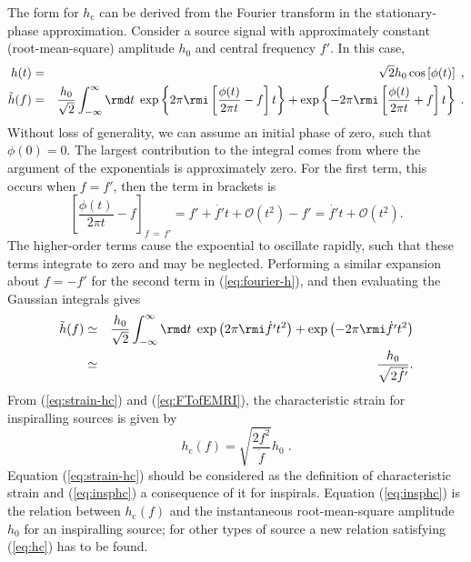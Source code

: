 The form for $h_\mathrm{c}$ can be derived from the Fourier transform in the stationary-phase approximation. Consider a source signal with approximately constant (root-mean-square) amplitude $h_0$ and central frequency $f'$. In this case,
\begin{eqnarray}
h(t) &=& \sqrt{2} h_0 \cos\left[\phi(t)\right] \; , \\
\tilde{h}(f) &=& \frac{h_0}{\sqrt{2}} \int_{-\infty}^{\infty}\rmd t\; \exp \left\{2\pi \rmi \left[\frac{\phi(t)}{2\pi t}-f\right]t\right\} + \exp \left\{-2\pi \rmi \left[\frac{\phi(t)}{2\pi t}+f\right]t\right\} \; .
\label{eq:fourier-h}
\end{eqnarray}
Without loss of generality, we can assume an initial phase of zero, such that $\phi(0) = 0$. The largest contribution to the integral comes from where the argument of the exponentials is approximately zero. For the first term, this occurs when $f = f'$, then the term in brackets is
\begin{equation}
\left[\frac{\phi(t)}{2\pi t}-f\right]_{f\,=\,f'} = f' + \dot{f'}t + \mathcal{O}\left(t^2\right) - f' = \dot{f'}t + \mathcal{O}\left(t^2\right).
\end{equation}
The higher-order terms cause the expoential to oscillate rapidly, such that these terms integrate to zero and may be neglected. Performing a similar expansion about $f = -f'$ for the second term in (\ref{eq:fourier-h}), and then evaluating the Gaussian integrals gives
\begin{eqnarray} \label{eq:FTofEMRI}
\tilde{h}(f) &\simeq& \frac{h_0}{\sqrt{2}} \int_{-\infty}^{\infty}\rmd t\; \exp\left(2\pi\rmi \dot{f'} t^{2}\right) + \exp\left(-2\pi\rmi \dot{f'} t^{2}\right) \nonumber \\
&\simeq& \frac{h_0}{\sqrt{2\dot{f'}}}.
\end{eqnarray}
From (\ref{eq:strain-hc}) and (\ref{eq:FTofEMRI}), the characteristic strain for inspiralling sources is given by \citep{FinnThorne}
\begin{equation}\label{eq:insphc}
h_\mathrm{c}(f) = \sqrt{\frac{2f^{2}}{\dot{f}}}h_0 \;.
\end{equation}
Equation (\ref{eq:strain-hc}) should be considered as the definition of characteristic strain and (\ref{eq:insphc}) a consequence of it for inspirals. Equation (\ref{eq:insphc}) is the relation between $h_\mathrm{c}(f)$ and the instantaneous root-mean-square amplitude $h_0$ for an inspiralling source; for other types of source a new relation satisfying (\ref{eq:hc}) has to be found.


